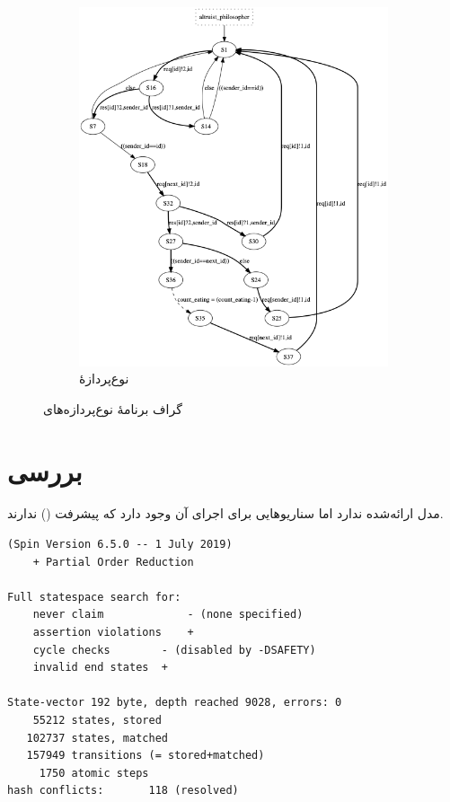 \documentclass[12pt, logo=tehranReport/logo]{tehranReport}
\begin{document}
\begin{figure}[H]
\begin{subfigure}[t]{0.4\textwidth}
    \includegraphics[width=\textwidth]{altruist_philosopher}
    \caption{نوع‌پردازهٔ }
\end{subfigure}
    \caption{گراف برنامهٔ نوع‌پردازه‌های }
\end{figure}

\section{بررسی }

مدل ارائه‌شده  ندارد اما سناریوهایی برای اجرای آن وجود دارد که پیشرفت () ندارند.

\begin{latin}
\small
\begin{verbatim}
(Spin Version 6.5.0 -- 1 July 2019)
    + Partial Order Reduction

Full statespace search for:
    never claim             - (none specified)
    assertion violations    +
    cycle checks        - (disabled by -DSAFETY)
    invalid end states  +

State-vector 192 byte, depth reached 9028, errors: 0
    55212 states, stored
   102737 states, matched
   157949 transitions (= stored+matched)
     1750 atomic steps
hash conflicts:       118 (resolved)
\end{verbatim}
\end{latin}
\end{document}
